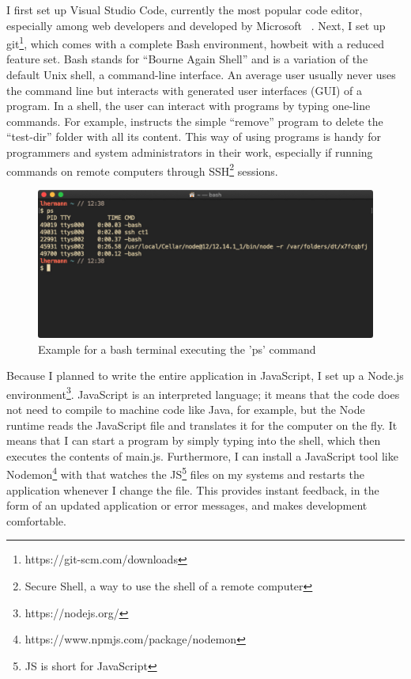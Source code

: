 I first set up Visual Studio Code, currently the most popular code editor, especially among web developers and developed by Microsoft ~\cite{stackoverflow.2019}. Next, I set up git\footnote{https://git-scm.com/downloads}, which comes with a complete Bash environment, howbeit with a reduced feature set. Bash stands for ``Bourne Again Shell'' and is a variation of the default Unix shell, a command-line interface. An average user usually never uses the command line but interacts with generated user interfaces (GUI) of a program. In a shell, the user can interact with programs by typing one-line commands. For example,  instructs the simple ``remove'' program to delete the ``test-dir'' folder with all its content. This way of using programs is handy for programmers and system administrators in their work, especially if running commands on remote computers through SSH\footnote{Secure Shell, a way to use the shell of a remote computer} sessions.

\begin{figure}[ht]
  \centering
  \includegraphics[width=0.75\linewidth]{assets/example-bash-window.jpg}
  \caption{Example for a bash terminal executing the 'ps' command}
\end{figure}

Because I planned to write the entire application in JavaScript, I set up a Node.js environment\footnote{https://nodejs.org/}. JavaScript is an interpreted language; it means that the code does not need to compile to machine code like Java, for example, but the Node runtime reads the JavaScript file and translates it for the computer on the fly. It means that I can start a program by simply typing  into the shell, which then executes the contents of main.js. Furthermore, I can install a JavaScript tool like Nodemon\footnote{https://www.npmjs.com/package/nodemon} with  that watches the JS\footnote{JS is short for JavaScript} files on my systems and restarts the application whenever I change the file. This provides instant feedback, in the form of an updated application or error messages, and makes development comfortable.

